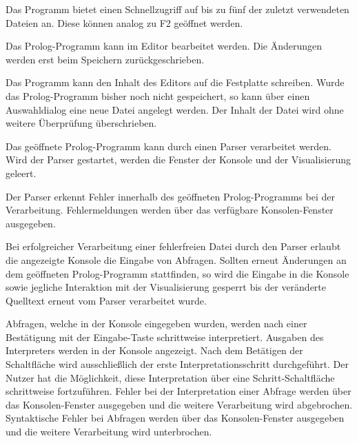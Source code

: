 \documentclass[parskip=full,11pt,twoside]{scrartcl}
\begin{document}
Das Programm bietet einen Schnellzugriff auf bis zu fünf der zuletzt verwendeten Dateien an. Diese können analog zu F2 geöffnet werden.


Das Prolog-Programm kann im Editor bearbeitet werden. Die Änderungen werden erst beim Speichern zurückgeschrieben.


Das Programm kann den Inhalt des Editors auf die Festplatte schreiben. Wurde das Prolog-Programm bisher noch nicht gespeichert, so kann über einen Auswahldialog eine neue Datei angelegt werden. Der Inhalt der Datei wird ohne weitere Überprüfung überschrieben.


Das geöffnete Prolog-Programm kann durch einen Parser verarbeitet werden. Wird der Parser gestartet, werden die Fenster der Konsole und der Visualisierung geleert.


Der Parser erkennt Fehler innerhalb des geöffneten Prolog-Programms bei der Verarbeitung. Fehlermeldungen werden über das verfügbare Konsolen-Fenster ausgegeben.


Bei erfolgreicher Verarbeitung einer fehlerfreien Datei durch den Parser erlaubt die angezeigte Konsole die Eingabe von Abfragen. Sollten erneut Änderungen an dem geöffneten Prolog-Programm stattfinden, so wird die Eingabe in die Konsole sowie jegliche Interaktion mit der Visualisierung gesperrt bis der veränderte Quelltext erneut vom Parser verarbeitet wurde.


Abfragen, welche in der Konsole eingegeben wurden, werden nach einer Bestätigung mit der Eingabe-Taste schrittweise interpretiert. Ausgaben des Interpreters werden in der Konsole angezeigt. Nach dem Betätigen der Schaltfläche wird ausschließlich der erste Interpretationsschritt durchgeführt. Der Nutzer hat die Möglichkeit, diese Interpretation über eine Schritt-Schaltfläche schrittweise fortzuführen. Fehler bei der Interpretation einer Abfrage werden über das Konsolen-Fenster ausgegeben und die weitere Verarbeitung wird abgebrochen. Syntaktische Fehler bei Abfragen werden über das Konsolen-Fenster ausgegeben und die weitere Verarbeitung wird unterbrochen.
\end{document}
